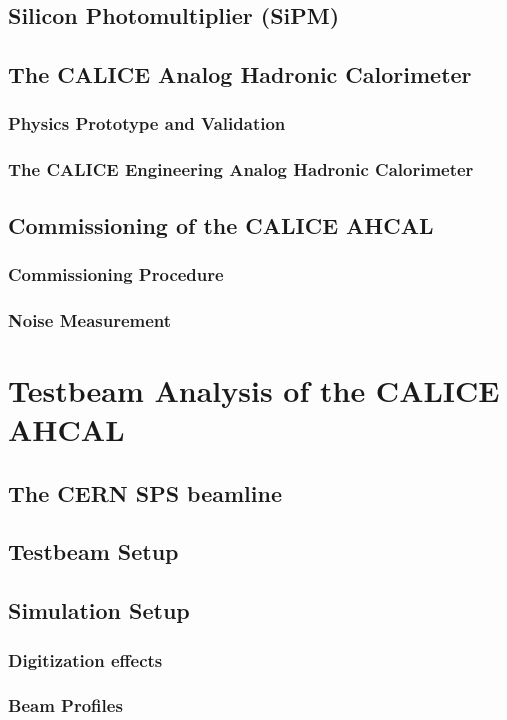 \documentclass[a4paper,12pt]{report}
\begin{document}
\section{Silicon Photomultiplier (SiPM)}
\section{The CALICE Analog Hadronic Calorimeter}
\subsection{Physics Prototype and Validation}
\subsection{The CALICE Engineering Analog Hadronic Calorimeter}
\section{Commissioning of the CALICE AHCAL}
\subsection{Commissioning Procedure}
\subsection{Noise Measurement}

\newpage

\chapter{Testbeam Analysis of the CALICE AHCAL}
\section{The CERN SPS beamline}
\section{Testbeam Setup}
\section{Simulation Setup}
\subsection{Digitization effects}
\subsection{Beam Profiles}
\end{document}
